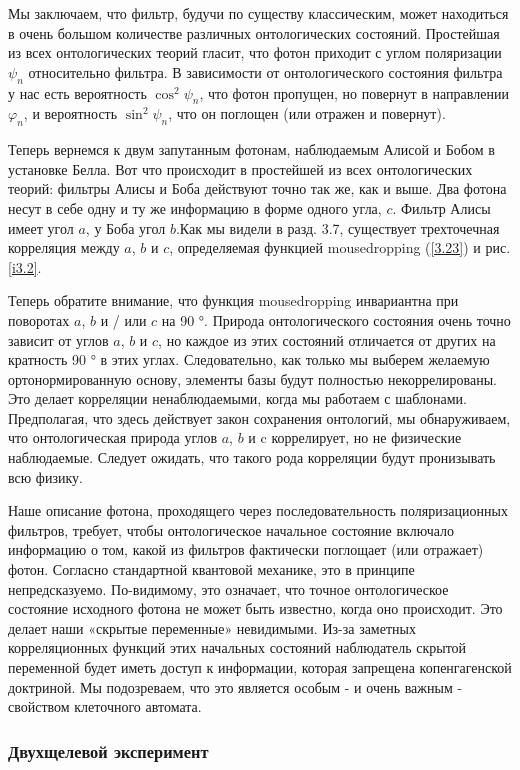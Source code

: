 \documentclass[main.tex]{subfiles}
\begin{document}
Мы заключаем, что фильтр, будучи по существу классическим, может находиться в очень большом количестве различных онтологических состояний. Простейшая из всех онтологических теорий гласит, что фотон приходит с углом поляризации $\psi_n$ относительно фильтра. В зависимости от онтологического состояния фильтра у нас есть вероятность $\cos^2 \psi_n$, что фотон пропущен, но повернут в направлении $\varphi_n$, и вероятность $\sin^2 \psi_n$, что он поглощен (или отражен и повернут).

Теперь вернемся к двум запутанным фотонам, наблюдаемым Алисой и Бобом в установке Белла. Вот что происходит в простейшей из всех онтологических теорий: фильтры Алисы и Боба действуют точно так же, как и выше. Два фотона несут в себе одну и ту же информацию в форме одного угла, $c$. Фильтр Алисы имеет угол $a$, у Боба угол $b$.Как мы видели в разд. 3.7, существует трехточечная корреляция между $a$, $b$ и $c$, определяемая функцией mousedropping (\ref{3.23}) и рис. \ref{i3.2}.

Теперь обратите внимание, что функция mousedropping инвариантна при поворотах $a$, $b$ и / или $c$ на 90 °. Природа онтологического состояния очень точно зависит от углов $a$, $b$ и $c$, но каждое из этих состояний отличается от других на кратность 90 ° в этих углах. Следовательно, как только мы выберем желаемую ортонормированную основу, элементы базы будут полностью некоррелированы. Это делает корреляции ненаблюдаемыми, когда мы работаем с шаблонами. Предполагая, что здесь действует закон сохранения онтологий, мы обнаруживаем, что онтологическая природа углов $a$, $b$ и c коррелирует, но не физические наблюдаемые. Следует ожидать, что такого рода корреляции будут пронизывать всю физику.

Наше описание фотона, проходящего через последовательность поляризационных фильтров, требует, чтобы онтологическое начальное состояние включало информацию о том, какой из фильтров фактически поглощает (или отражает) фотон. Согласно стандартной квантовой механике, это в принципе непредсказуемо. По-видимому, это означает, что точное онтологическое состояние исходного фотона не может быть известно, когда оно происходит. Это делает наши «скрытые переменные» невидимыми. Из-за заметных корреляционных функций этих начальных состояний наблюдатель скрытой переменной будет иметь доступ к информации, которая запрещена копенгагенской доктриной. Мы подозреваем, что это является особым - и очень важным - свойством клеточного автомата.


\subsubsection{Двухщелевой эксперимент}\label{ch5.7.9}
\end{document}
